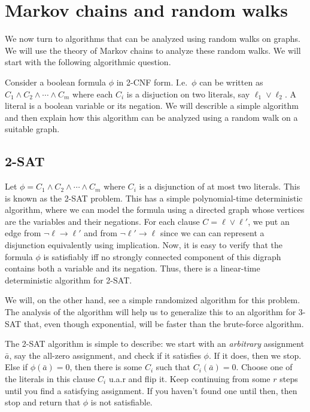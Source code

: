 \chapter{Markov chains and random walks}

We now turn to algorithms that can be analyzed using random walks on graphs. We
will use the theory of Markov chains to analyze these random walks. We will
start with the following algorithmic question.

Consider a boolean formula $\phi$ in 2-CNF form. I.e.\ $\phi$ can be written as
$C_1 \wedge C_2 \wedge \cdots \wedge C_m$ where each $C_i$ is a disjuction on
two literals, say $\ell_1 \vee \ell_2$. A literal is a boolean variable or its
negation. We will describle a simple algorithm and then explain how this
algorithm can be analyzed using a random walk on a suitable graph.

\section{2-SAT}

Let $\phi = C_1 \wedge C_2 \wedge \cdots \wedge C_m$ where $C_i$ is a
disjunction of at most two literals. This is known as the 2-SAT problem. This
has a simple polynomial-time deterministic algorithm, where we can model the
formula using a directed graph whose vertices are the variables and their
negations. For each clause $C = \ell \vee \ell'$, we put an edge from
$\neg \ell \to \ell'$ and from $\neg \ell' \to \ell$ since we can can represent
a disjunction equivalently using implication. Now, it is easy to verify that the
formula $\phi$ is satisfiably iff no strongly connected component of this
digraph contains both a variable and its negation. Thus, there is a linear-time
deterministic algorithm for 2-SAT.

We will, on the other hand, see a simple randomized algorithm for this
problem. The analysis of the algorithm will help us to generalize this to an
algorithm for 3-SAT that, even though exponential, will be faster than the
brute-force algorithm.

The 2-SAT algorithm is simple to describe: we start with an \emph{arbitrary}
assignment $\bar{a}$, say the all-zero assignment, and check if it satisfies
$\phi$. If it does, then we stop. Else if $\phi(\bar{a}) = 0$, then there is
some $C_i$ such that $C_i(\bar{a}) = 0$. Choose one of the literals in this
clause $C_i$ u.a.r and flip it. Keep continuing from some $r$ steps until you find a satisfying
assignment. If you haven't found one until then, then stop and return that
$\phi$ is not satisfiable.

